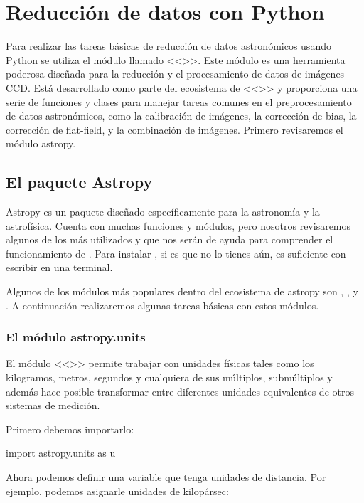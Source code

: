 \chapter{Reducción de datos con Python}
\setcounter{ipythcntr}{0}

Para realizar las tareas básicas de reducción de datos astronómicos usando Python se utiliza el módulo llamado <<>>. Este módulo es una herramienta poderosa diseñada para la reducción y el procesamiento de datos de imágenes CCD. Está desarrollado como parte del ecosistema de <<>> y proporciona una serie de funciones y clases para manejar tareas comunes en el preprocesamiento de datos astronómicos, como la calibración de imágenes, la corrección de bias, la corrección de flat-field, y la combinación de imágenes. Primero revisaremos el módulo astropy.

\section{El paquete Astropy}
Astropy es un paquete diseñado específicamente para la astronomía y la astrofísica. Cuenta con muchas funciones y módulos, pero nosotros revisaremos algunos de los más utilizados y que nos serán de ayuda para comprender el funcionamiento de . Para instalar , si es que no lo tienes aún, es suficiente con escribir  en una terminal. 

Algunos de los módulos más populares dentro del ecosistema de astropy son , , y . A continuación realizaremos algunas tareas básicas con estos módulos.

\subsection{El módulo astropy.units}
El módulo <<>> permite trabajar con unidades físicas tales como los kilogramos, metros, segundos y cualquiera de sus múltiplos, submúltiplos y además hace posible transformar entre diferentes unidades equivalentes de otros sistemas de medición. 

Primero debemos importarlo:
\begin{pyin}
import astropy.units as u
\end{pyin}

Ahora podemos definir una variable que tenga unidades de distancia. Por ejemplo, podemos asignarle unidades de kilopársec:


